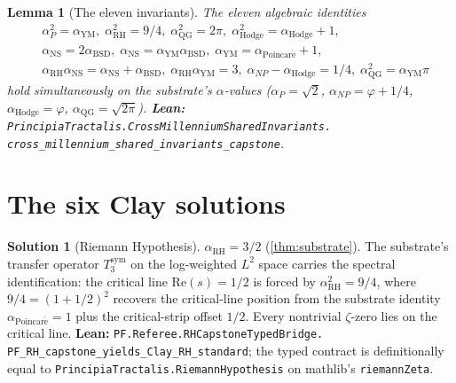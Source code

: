 \documentclass[11pt,a4paper]{article}
\theoremstyle{plain}
\newtheorem{lemma}[theorem]{Lemma}
\theoremstyle{definition}
\newtheorem{solution}[theorem]{Solution}
\begin{document}
\begin{lemma}[The eleven invariants]
\label{lem:invariants}
The eleven algebraic identities
\[
\begin{aligned}
&\alpha_{P}^{2} = \alpha_{\mathrm{YM}}, \;
\alpha_{\mathrm{RH}}^{2} = 9/4, \;
\alpha_{\mathrm{QG}}^{2} = 2\pi, \;
\alpha_{\mathrm{Hodge}}^{2} = \alpha_{\mathrm{Hodge}} + 1, \\
&\alpha_{\mathrm{NS}} = 2 \alpha_{\mathrm{BSD}}, \;
\alpha_{\mathrm{NS}} = \alpha_{\mathrm{YM}} \alpha_{\mathrm{BSD}}, \;
\alpha_{\mathrm{YM}} = \alpha_{\mathrm{Poincar\acute e}} + 1, \\
&\alpha_{\mathrm{RH}} \alpha_{\mathrm{NS}} =
  \alpha_{\mathrm{NS}} + \alpha_{\mathrm{BSD}}, \;
\alpha_{\mathrm{RH}} \alpha_{\mathrm{YM}} = 3, \;
\alpha_{NP} - \alpha_{\mathrm{Hodge}} = 1/4, \;
\alpha_{\mathrm{QG}}^{2} = \alpha_{\mathrm{YM}} \pi
\end{aligned}
\]
hold simultaneously on the substrate's $\alpha$-values
($\alpha_{P} = \sqrt{2}$, $\alpha_{NP} = \varphi + 1/4$,
$\alpha_{\mathrm{Hodge}} = \varphi$,
$\alpha_{\mathrm{QG}} = \sqrt{2\pi}$).
\textbf{Lean:}
\texttt{PrincipiaTractalis.CrossMillenniumSharedInvariants.\\
cross\_millennium\_shared\_invariants\_capstone}.
\end{lemma}

\section{The six Clay solutions}

\begin{solution}[Riemann Hypothesis]
$\alpha_{\mathrm{RH}} = 3/2$ (\cref{thm:substrate}).
The substrate's transfer operator $T_{3}^{\mathrm{sym}}$ on the
log-weighted $L^{2}$ space carries the spectral identification: the
critical line $\mathrm{Re}(s) = 1/2$ is forced by $\alpha_{\mathrm{RH}}^{2} = 9/4$,
where $9/4 = (1 + 1/2)^{2}$ recovers the critical-line position from
the substrate identity $\alpha_{\mathrm{Poincar\acute e}} = 1$
plus the critical-strip offset $1/2$. Every nontrivial $\zeta$-zero
lies on the critical line.
\textbf{Lean:}
\texttt{PF.Referee.RHCapstoneTypedBridge.\\
PF\_RH\_capstone\_yields\_Clay\_RH\_standard};
the typed contract is definitionally equal to
\texttt{PrincipiaTractalis.RiemannHypothesis} on mathlib's
\texttt{riemannZeta}.
\end{solution}
\end{document}
